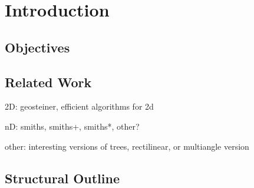 {
\abnormalparskip{0pt}
\chapter{Introduction}
\label{cha:introduction}
}


\section{Objectives}
\label{sec:objectives}


\section{Related Work}
\label{sec:related-work}

2D: geosteiner, efficient algorithms for 2d

nD: smiths, smiths+, smiths*, other?

other: interesting versions of trees, rectilinear, or multiangle version


\section{Structural Outline}
\label{sec:structural-outline}


